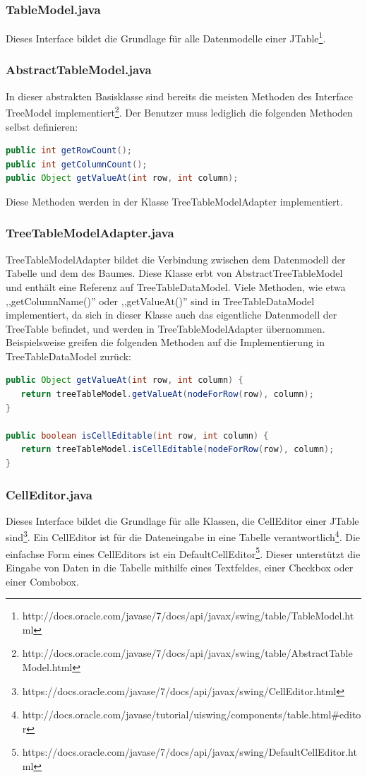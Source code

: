 \subsubsection*{TableModel.java}
Dieses Interface bildet die Grundlage für alle Datenmodelle einer JTable\footnote{http://docs.oracle.com/javase/7/docs/api/javax/swing/table/TableModel.html}.

\subsubsection*{AbstractTableModel.java}
In dieser abstrakten Basisklasse sind bereits die meisten Methoden des Interface TreeModel implementiert\footnote{http://docs.oracle.com/javase/7/docs/api/javax/swing/table/AbstractTableModel.html}. Der Benutzer muss lediglich die folgenden Methoden selbst definieren:
\begin{lstlisting}[language=JAVA]
public int getRowCount();
public int getColumnCount();
public Object getValueAt(int row, int column);
\end{lstlisting}
Diese Methoden werden in der Klasse TreeTableModelAdapter implementiert.

\subsubsection*{TreeTableModelAdapter.java}
TreeTableModelAdapter bildet die Verbindung zwischen dem Datenmodell der Tabelle und dem des Baumes. Diese Klasse erbt von AbstractTreeTableModel und enthält eine Referenz auf TreeTableDataModel. Viele Methoden, wie etwa ,,getColumnName()'' oder ,,getValueAt()'' sind in TreeTableDataModel implementiert, da sich in dieser Klasse auch das eigentliche Datenmodell der TreeTable befindet, und werden in TreeTableModelAdapter übernommen. Beispielsweise greifen die folgenden Methoden auf die Implementierung in TreeTableDataModel zurück:
\begin{lstlisting}[language=JAVA]
public Object getValueAt(int row, int column) {
   return treeTableModel.getValueAt(nodeForRow(row), column);
}

public boolean isCellEditable(int row, int column) {
   return treeTableModel.isCellEditable(nodeForRow(row), column);
}
\end{lstlisting}

\subsubsection*{CellEditor.java}
Dieses Interface bildet die Grundlage für alle Klassen, die CellEditor einer JTable sind\footnote{https://docs.oracle.com/javase/7/docs/api/javax/swing/CellEditor.html}.
Ein CellEditor ist für die Dateneingabe in eine Tabelle verantwortlich\footnote{http://docs.oracle.com/javase/tutorial/uiswing/components/table.html\#editor}. Die einfachse Form eines CellEditors ist ein DefaultCellEditor\footnote{https://docs.oracle.com/javase/7/docs/api/javax/swing/DefaultCellEditor.html}. Dieser unterstützt die Eingabe von Daten in die Tabelle mithilfe eines Textfeldes, einer Checkbox oder einer Combobox.

